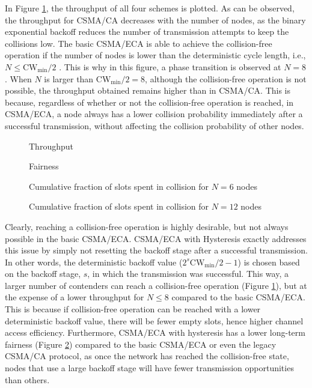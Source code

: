 \documentclass[conference]{IEEEtran}
\newcommand{\AzCom}[1]{}
\begin{document}
In Figure \ref{Fig:throughput}, the throughput of all four schemes is plotted. As can be observed, the throughput for CSMA/CA decreases with the number of nodes, as the binary exponential backoff reduces the number of transmission attempts to keep the collisions low. The basic CSMA/ECA is able to achieve the collision-free operation if the number of nodes is lower than the deterministic cycle length, i.e., $N\leq \text{CW}_{\min}/2$ \AzCom{This time the $-1$ is not required, but it should be cycle length instead of backoff value, right?}. This is why in this figure, a phase transition is observed at $N=8$. When $N$ is larger than $\text{CW}_{\min}/2=8$, although the collision-free operation is not possible, the throughput obtained remains higher than in CSMA/CA. This is because, regardless of whether or not the collision-free operation is reached, in CSMA/ECA, a node always has a lower collision probability immediately after a successful transmission, without affecting the collision probability of other nodes.

\begin{figure}[ht!!!!!!!!]
\centering
{}
\caption{Throughput}\label{Fig:throughput}
\end{figure}

\begin{figure}[ht!!!!!!!!]
\centering
{}
\caption{Fairness}\label{Fig:fairness}
\end{figure}


\begin{figure}[ht!!!!!!!!]
\centering
{}
\caption{Cumulative fraction of slots spent in collision for $N=6$ nodes}\label{Fig:Pc_6}
\end{figure}


\begin{figure}[ht!!!!!!!!]
\centering
{}
\caption{Cumulative fraction of slots spent in collision for $N=12$ nodes}\label{Fig:Pc_12}
\end{figure}

Clearly, reaching a collision-free operation is highly desirable, but not always possible in the basic CSMA/ECA. CSMA/ECA with Hysteresis exactly addresses this issue by simply not resetting the backoff stage after a successful transmission. In other words, the deterministic backoff value ($2^s \text{CW}_{\min}/2-1$) is chosen based on the backoff stage, $s$, in which the transmission was successful. This way, a larger number of contenders can reach a collision-free operation (Figure \ref{Fig:throughput}), but at the expense of a lower throughput for $N\leq 8$ compared to the basic CSMA/ECA. This is because if collision-free operation can be reached with a lower deterministic backoff value, there will be fewer empty slots, hence higher channel access efficiency. Furthermore, CSMA/ECA with hysteresis has a lower long-term fairness (Figure \ref{Fig:fairness}) compared to the basic CSMA/ECA or even the legacy CSMA/CA protocol, as once the network has reached the collision-free state, nodes that use a large backoff stage will have fewer transmission opportunities than others.
\end{document}
